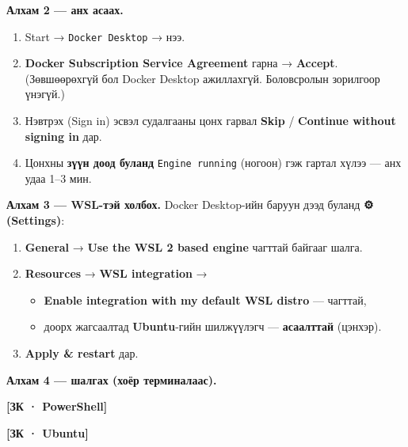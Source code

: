 \textbf{Алхам 2 --- анх асаах.}

\begin{enumerate}
\def\labelenumi{\arabic{enumi}.}
\tightlist
\item
  Start → \texttt{Docker\ Desktop} → нээ.
\item
  \textbf{Docker Subscription Service Agreement} гарна → \textbf{Accept}. (Зөвшөөрөхгүй бол Docker Desktop ажиллахгүй. Боловсролын зорилгоор үнэгүй.)
\item
  Нэвтрэх (Sign in) эсвэл судалгааны цонх гарвал \textbf{Skip} / \textbf{Continue without signing in} дар.
\item
  Цонхны \textbf{зүүн доод буланд} \texttt{Engine\ running} (ногоон) гэж гартал хүлээ --- анх удаа 1--3 мин.
\end{enumerate}

\textbf{Алхам 3 --- WSL-тэй холбох.} Docker Desktop-ийн баруун дээд буланд \textbf{⚙ (Settings)}:

\begin{enumerate}
\def\labelenumi{\arabic{enumi}.}
\tightlist
\item
  \textbf{General} → \textbf{Use the WSL 2 based engine} чагттай байгааг шалга.
\item
  \textbf{Resources} → \textbf{WSL integration} →

  \begin{itemize}
  \tightlist
  \item
    \textbf{Enable integration with my default WSL distro} --- чагттай,
  \item
    доорх жагсаалтад \textbf{Ubuntu}-гийн шилжүүлэгч --- \textbf{асаалттай} (цэнхэр).
  \end{itemize}
\item
  \textbf{Apply \& restart} дар.
\end{enumerate}

\textbf{Алхам 4 --- шалгах (хоёр терминалаас).}

\textbf{{[}ЗК · PowerShell{]}}

\begin{Shaded}
\begin{Highlighting}[]
\end{Highlighting}
\end{Shaded}

\textbf{{[}ЗК · Ubuntu{]}}

\begin{Shaded}
\begin{Highlighting}[]
\end{Highlighting}
\end{Shaded}

